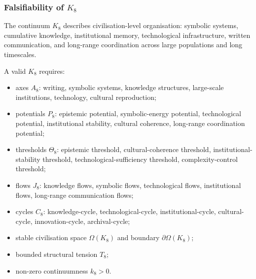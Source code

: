 
\subsubsection{Falsifiability of \texorpdfstring{$K_8$}{K_8}}
\label{sec:falsifiability-k8}

The continuum $K_8$ describes civilisation-level organisation:
symbolic systems, cumulative knowledge, institutional memory,
technological infrastructure, written communication,
and long-range coordination across large populations and long timescales.

A valid $K_8$ requires:

\begin{itemize}
    \item axes $A_8$: writing, symbolic systems, knowledge structures,
          large-scale institutions, technology, cultural reproduction;
    \item potentials $P_8$: epistemic potential, symbolic-energy potential,
          technological potential, institutional stability,
          cultural coherence, long-range coordination potential;
    \item thresholds $\Theta_8$: epistemic threshold,
          cultural-coherence threshold,
          institutional-stability threshold,
          technological-sufficiency threshold,
          complexity-control threshold;
    \item flows $J_8$: knowledge flows, symbolic flows,
          technological flows, institutional flows,
          long-range communication flows;
    \item cycles $C_8$: knowledge-cycle, technological-cycle,
          institutional-cycle, cultural-cycle,
          innovation-cycle, archival-cycle;
    \item stable civilisation space $\Omega(K_8)$ and boundary $\partial\Omega(K_8)$;
    \item bounded structural tension $T_8$;
    \item non-zero continuumness $k_8>0$.
\end{itemize}

